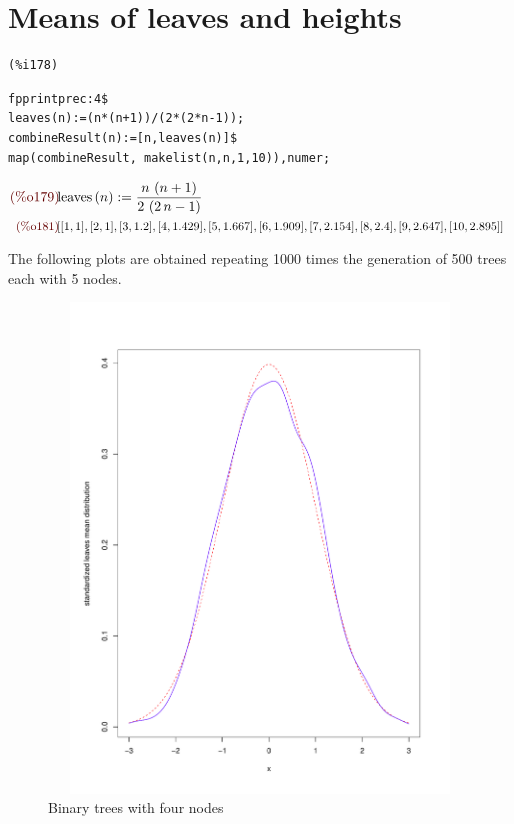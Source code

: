 \section{Means of leaves and heights}


\noindent
\begin{minipage}[t]{8ex}{\color{red}\bf
\begin{verbatim}
(%i178) 
\end{verbatim}}
\end{minipage}
\begin{minipage}[t]{\textwidth}{\color{blue}
\begin{verbatim}
fpprintprec:4$
leaves(n):=(n*(n+1))/(2*(2*n-1));
combineResult(n):=[n,leaves(n)]$
map(combineResult, makelist(n,n,1,10)),numer;
\end{verbatim}}
\end{minipage}
\begin{math}\displaystyle
\parbox{8ex}{\color{labelcolor}(\%o179) }
\mathrm{leaves}\left( n\right) :=\frac{n\,\left( n+1\right)
}{2\,\left( 2\,n-1\right) }
\end{math}\\
\begin{math}\displaystyle
\parbox{8ex}{\color{labelcolor}(\%o181) }
[[1,1],[2,1],[3,1.2],[4,1.429],[5,1.667],[6,1.909],[7,2.154],[8,2.4],[9,2.647],[10,2.895]]
\end{math}


The following plots are obtained repeating 1000 times the generation
of 500 trees each with 5 nodes.
\begin{figure}[htb]
  \centering
  \includegraphics[height=13cm,
  width=13cm]{pictures/repeated-sampling-leaves-mean.pdf}
  \caption{Binary trees with four nodes}
  \label{fig:binary-trees-with-four-nodes}
\end{figure}

